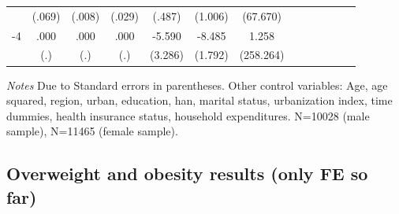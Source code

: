 \begin{table}[h]
\begin{adjustbox}{max width=\linewidth}
\begin{threeparttable}
{\begin{tabular}{l*{6}{SS}}
                &   (.069)         &   (.008)         &   (.029)         &   (.487)         &  (1.006)         & (67.670)         \\
-4             &     .000         &     .000         &     .000         &   -5.590\sym{*}  &   -8.485\sym{***}&    1.258         \\
                &      (.)         &      (.)         &      (.)         &  (3.286)         &  (1.792)         &(258.264)         \\      
\bottomrule
\end{tabular}
\begin{tablenotes}
\item \textit{Notes} Due to    Standard errors in parentheses.
Other control variables: Age, age squared, region, urban, education, han, marital status, urbanization index, time dummies, health insurance status, household expenditures.    N=10028 (male sample), N=11465 (female sample).
\end{tablenotes}
}
\end{threeparttable}
\end{adjustbox}
\end{table}

\FloatBarrier





\subsection*{Overweight and obesity results (only FE so far)}

